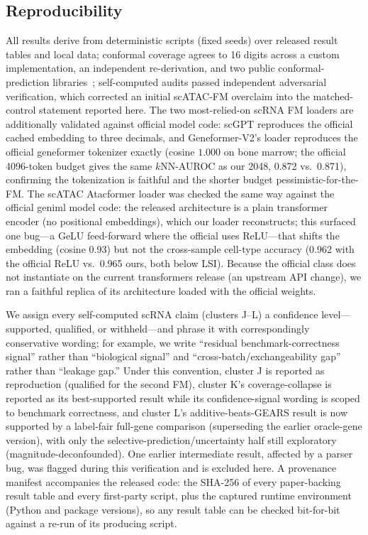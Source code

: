 \documentclass[fleqn,10pt,lineno]{wlpeerj}  %
\begin{document}
\subsection{Reproducibility}\label{sec:repro}
All results derive from deterministic scripts (fixed seeds) over released result tables and local data; conformal coverage agrees to 16 digits across a custom implementation, an independent re-derivation, and two public conformal-prediction libraries~\cite{crepes,mapie}; self-computed audits passed independent adversarial verification, which corrected an initial scATAC-FM overclaim into the matched-control statement reported here. The two most-relied-on scRNA FM loaders are additionally validated against official model code: scGPT reproduces the official cached embedding to three decimals, and Geneformer-V2's loader reproduces the official geneformer tokenizer exactly (cosine $1.000$ on bone marrow; the official 4096-token budget gives the same $k$NN-AUROC as our 2048, 0.872 vs.\ 0.871), confirming the tokenization is faithful and the shorter budget pessimistic-for-the-FM. The scATAC Atacformer loader was checked the same way against the official geniml model code: the released architecture is a plain transformer encoder (no positional embeddings), which our loader reconstructs; this surfaced one bug---a GeLU feed-forward where the official uses ReLU---that shifts the embedding (cosine 0.93) but not the cross-sample cell-type accuracy (0.962 with the official ReLU vs.\ 0.965 ours, both below LSI). Because the official class does not instantiate on the current transformers release (an upstream API change), we ran a faithful replica of its architecture loaded with the official weights.

We assign every self-computed scRNA claim (clusters J--L) a confidence level---supported, qualified, or withheld---and phrase it with correspondingly conservative wording; for example, we write ``residual benchmark-correctness signal'' rather than ``biological signal'' and ``cross-batch/exchangeability gap'' rather than ``leakage gap.'' Under this convention, cluster J is reported as reproduction (qualified for the second FM), cluster K's coverage-collapse is reported as its best-supported result while its confidence-signal wording is scoped to benchmark correctness, and cluster L's additive-beats-GEARS result is now supported by a label-fair full-gene comparison (superseding the earlier oracle-gene version), with only the selective-prediction/uncertainty half still exploratory (magnitude-deconfounded). One earlier intermediate result, affected by a parser bug, was flagged during this verification and is excluded here. A provenance manifest accompanies the released code: the SHA-256 of every paper-backing result table and every first-party script, plus the captured runtime environment (Python and package versions), so any result table can be checked bit-for-bit against a re-run of its producing script.
\end{document}
